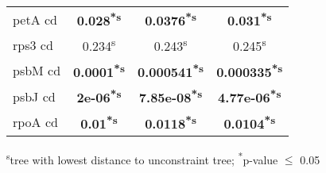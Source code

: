 \documentclass[a4paper]{article}
\begin{document}
\begin{longtable}{l|c|c|c}
petA cd&\textbf{0.028\textsuperscript{*}\textsuperscript{s}}&\textbf{0.0376\textsuperscript{*}\textsuperscript{s}}&\textbf{0.031\textsuperscript{*}\textsuperscript{s}}\\
rps3 cd&0.234\textsuperscript{s}&0.243\textsuperscript{s}&0.245\textsuperscript{s}\\
psbM cd&\textbf{0.0001\textsuperscript{*}\textsuperscript{s}}&\textbf{0.000541\textsuperscript{*}\textsuperscript{s}}&\textbf{0.000335\textsuperscript{*}\textsuperscript{s}}\\
psbJ cd&\textbf{2e-06\textsuperscript{*}\textsuperscript{s}}&\textbf{7.85e-08\textsuperscript{*}\textsuperscript{s}}&\textbf{4.77e-06\textsuperscript{*}\textsuperscript{s}}\\
rpoA cd&\textbf{0.01\textsuperscript{*}\textsuperscript{s}}&\textbf{0.0118\textsuperscript{*}\textsuperscript{s}}&\textbf{0.0104\textsuperscript{*}\textsuperscript{s}}\\
\end{longtable}
\textsuperscript{s}tree with lowest distance to unconstraint tree; \textsuperscript{*}p-value $\leq$ 0.05
\end{document}
